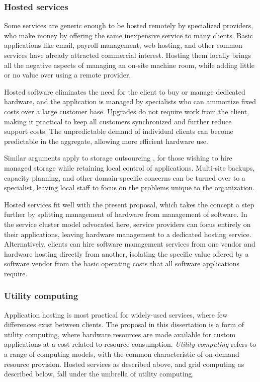 \subsubsection{Hosted services}

Some services are generic enough to be hosted remotely by specialized providers, who make money by offering the same inexpensive service to many clients. Basic applications like email, payroll management, web hosting, and other common services have already attracted commercial interest. Hosting them locally brings all the negative aspects of managing an on-site machine room, while adding little or no value over using a remote provider.

Hosted software eliminates the need for the client to buy or manage dedicated hardware, and the application is managed by specialists who can ammortize fixed costs over a large customer base. Upgrades do not require work from the client, making it practical to keep all customers synchronized and further reduce support costs. The unpredictable demand of individual clients can become predictable in the aggregate, allowing more efficient hardware use.

Similar arguments apply to storage outsourcing \cite{ng}, for those wishing to hire managed storage while retaining local control of applications. Multi-site backups, capacity planning, and other domain-specific concerns can be turned over to a specialist, leaving local staff to focus on the problems unique to the organization.

Hosted services fit well with the present proposal, which takes the concept a step further by splitting management of hardware from management of software. In the service cluster model advocated here, service providers can focus entirely on their applications, leaving hardware management to a dedicated hosting service. Alternatively, clients can hire software management services from one vendor and hardware hosting directly from another, isolating the specific value offered by a software vendor from the basic operating costs that all software applications require.

\subsubsection{Utility computing}

Application hosting is most practical for widely-used services, where few differences exist between clients. The proposal in this dissertation is a form of utility computing, where hardware resources are made available for custom applications at a cost related to resource consumption. \emph{Utility computing} refers to a range of computing models, with the common characteristic of on-demand resource provision. Hosted services as described above, and grid computing as described below, fall under the umbrella of utility computing.

